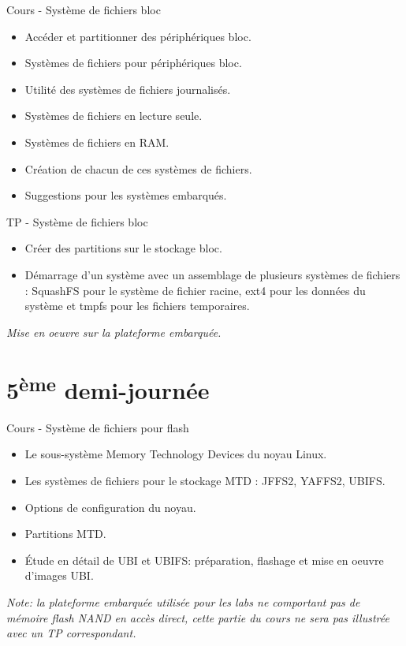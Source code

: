 \documentclass[a4paper,12pt,obeyspaces,spaces,hyphens]{article}
\begin{document}
\feagendatwocolumn
{Cours - Système de fichiers bloc}
{
  \begin{itemize}
  \item Accéder et partitionner des périphériques bloc.
  \item Systèmes de fichiers pour périphériques bloc.
  \item Utilité des systèmes de fichiers journalisés.
  \item Systèmes de fichiers en lecture seule.
  \item Systèmes de fichiers en RAM.
  \item Création de chacun de ces systèmes de fichiers.
  \item Suggestions pour les systèmes embarqués.
  \end{itemize}
}
{TP - Système de fichiers bloc}
{
  \begin{itemize}
  \item Créer des partitions sur le stockage bloc.
  \item Démarrage d'un système avec un assemblage de plusieurs systèmes
    de fichiers : SquashFS pour le système de fichier racine, ext4 pour
    les données du système et tmpfs pour les fichiers temporaires.
  \end{itemize}
  \vspace{0.5cm}
  {\em Mise en oeuvre sur la plateforme embarquée.}
}

\section{5\textsuperscript{ème} demi-journée}

\feagendaonecolumn
{Cours - Système de fichiers pour flash}
{
  \begin{itemize}
  \item Le sous-système Memory Technology Devices du noyau Linux.
  \item Les systèmes de fichiers pour le stockage MTD : JFFS2, YAFFS2,
    UBIFS.
  \item Options de configuration du noyau.
  \item Partitions MTD.
  \item Étude en détail de UBI et UBIFS: préparation, flashage et mise
    en oeuvre d'images UBI.
  \end{itemize}

  \vspace{0.5cm}

  {\em Note: la plateforme embarquée utilisée pour les labs ne
    comportant pas de mémoire flash NAND en accès direct, cette partie
    du cours ne sera pas illustrée avec un TP correspondant.}
}
\end{document}
